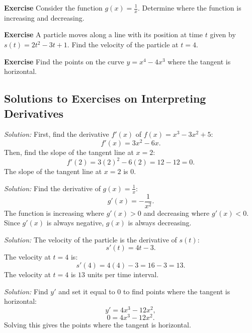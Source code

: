 \documentclass[a4paper,12pt]{book}
\newenvironment{exercise}[1][]
  {\par\medskip\noindent\textbf{Exercise #1} \rmfamily}
  {\medskip}
\newenvironment{solution}[1][]
{\par\noindent\textit{Solution:} \rmfamily}{\medskip}
\begin{document}
\begin{exercise}
Consider the function \( g(x) = \frac{1}{x} \). Determine where the function is increasing and decreasing.
\end{exercise}

\begin{exercise}
A particle moves along a line with its position at time \( t \) given by \( s(t) = 2t^2 - 3t + 1 \). Find the velocity of the particle at \( t = 4 \).
\end{exercise}

\begin{exercise}
Find the points on the curve \( y = x^4 - 4x^3 \) where the tangent is horizontal.
\end{exercise}

\subsection{Solutions to Exercises on Interpreting Derivatives}

\begin{solution}[to Exercise 1]
First, find the derivative \( f'(x) \) of \( f(x) = x^3 - 3x^2 + 5 \):
\[ f'(x) = 3x^2 - 6x. \]
Then, find the slope of the tangent line at \( x = 2 \):
\[ f'(2) = 3(2)^2 - 6(2) = 12 - 12 = 0. \]
The slope of the tangent line at \( x = 2 \) is \( 0 \).
\end{solution}

\begin{solution}[to Exercise 2]
Find the derivative of \( g(x) = \frac{1}{x} \):
\[ g'(x) = -\frac{1}{x^2}. \]
The function is increasing where \( g'(x) > 0 \) and decreasing where \( g'(x) < 0 \). Since \( g'(x) \) is always negative, \( g(x) \) is always decreasing.
\end{solution}

\begin{solution}[to Exercise 3]
The velocity of the particle is the derivative of \( s(t) \):
\[ s'(t) = 4t - 3. \]
The velocity at \( t = 4 \) is:
\[ s'(4) = 4(4) - 3 = 16 - 3 = 13. \]
The velocity at \( t = 4 \) is \( 13 \) units per time interval.
\end{solution}

\begin{solution}[to Exercise 4]
Find \( y' \) and set it equal to \( 0 \) to find points where the tangent is horizontal:
\[ y' = 4x^3 - 12x^2, \]
\[ 0 = 4x^3 - 12x^2. \]
Solving this gives the points where the tangent is horizontal.
\end{solution}
\end{document}
